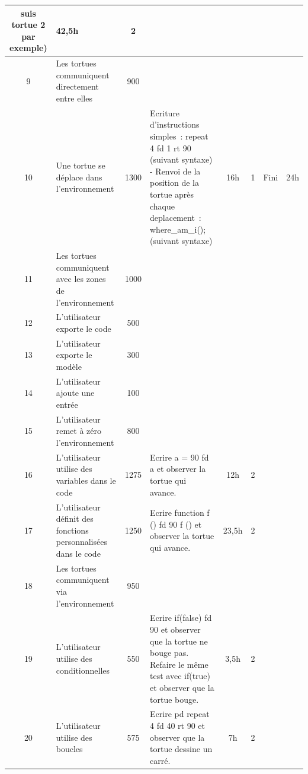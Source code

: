 {\begin{longtable}[c]{|c|p{2cm}|c|p{4cm}|*{4}{c|}}
suis tortue 2 par exemple) & 42,5h & 2 & & \\
\hline
9 & Les tortues communiquent directement entre elles & 900 &  &  &  &  &  \\
\hline
10 & Une tortue se déplace dans l'environnement & 1300 & Ecriture d'instructions simples~: repeat 4 { fd 1 rt 90 } (suivant syntaxe) - Renvoi de la position de la tortue après chaque deplacement~: where\_am\_i(); (suivant syntaxe) & 16h & 1 & Fini & 24h \\
\hline
11 & Les tortues communiquent avec les zones de l'environnement & 1000 &  &  &  &  &  \\
\hline
12 & L'utilisateur exporte le code & 500 &  &  &  &  &  \\
\hline
13 & L'utilisateur exporte le modèle & 300 &  &  &  &  &  \\
\hline
14 & L'utilisateur ajoute une entrée & 100 &  &  &  &  &  \\
\hline
15 & L'utilisateur remet à zéro l'environnement & 800 &  &  &  &  &  \\
\hline
16 & L'utilisateur utilise des variables dans le code & 1275 & Ecrire a = 90 fd a et observer la tortue qui avance. & 12h & 2 &  &  \\
\hline
17 & L'utilisateur définit des fonctions personnalisées dans le code & 1250 & Ecrire function f () { fd 90 } f () et observer la tortue qui avance. & 23,5h & 2 & &  \\
\hline
18 & Les tortues communiquent via l'environnement & 950 &  &  &  &  &  \\
\hline
19 & L'utilisateur utilise des conditionnelles & 550 & Ecrire if(false) { fd 90 } et observer que la tortue ne bouge pas. Refaire le même test avec if(true) et observer que la tortue bouge. & 3,5h & 2 &  &  \\
\hline
20 & L'utilisateur utilise des boucles & 575 & Ecrire pd repeat 4 { fd 40 rt 90 } et observer que la tortue dessine un carré. & 7h & 2 &  &  \\
\hline
\end{longtable}}
